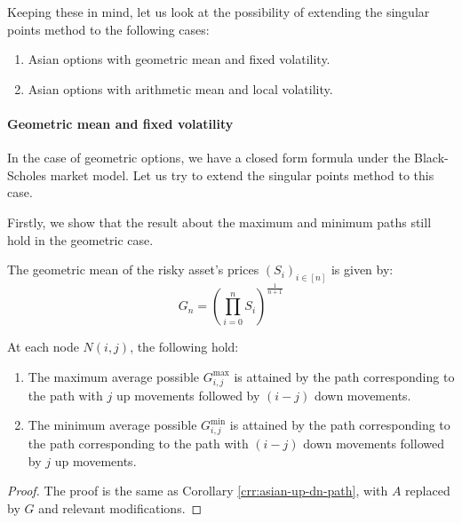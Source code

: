 Keeping these in mind, let us look at the possibility of extending the singular points method to the following cases:
\begin{enumerate}
	\item Asian options with geometric mean and fixed volatility.
	\item Asian options with arithmetic mean and local volatility.
\end{enumerate}



\paragraph{Geometric mean and fixed volatility}
In the case of geometric options, we have a closed form formula under the Black-Scholes market model. Let us try to extend the singular points method to this case.

Firstly, we show that the result about the maximum and minimum paths still hold in the geometric case.

\begin{dfn}
	The geometric mean of the risky asset's prices $ (S_i)_{i \in [n]} $ is given by:
	\begin{equation}
		\label{eq:gm}
		G_{n} = \left( \prod_{i=0}^n S_i \right) ^{\frac{1}{n+1}}
	\end{equation}
\end{dfn}


\begin{lmm}
	At each node $N(i,j)$, the following hold:
	\begin{enumerate}
	\item The maximum average possible $ G_{i,j}^{\max} $ is attained by the path corresponding to the path with $j$ up movements followed by $(i-j)$ down movements.
	\item The minimum average possible $ G_{i,j}^{\min} $ is attained by the path corresponding to the path corresponding to the path with $(i-j)$ down movements followed by $j$ up movements.
	\end{enumerate}
\end{lmm}

\begin{proof}
	The proof is the same as Corollary \ref{crr:asian-up-dn-path}, with $A$ replaced by $G$ and relevant modifications.
\end{proof}


